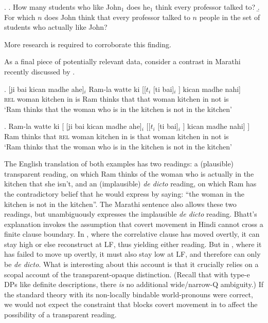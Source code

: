 \ex. \a. How many students who like John$_{1}$ does he$_{1}$ think every professor talked to? 
\b. For which $n$ does John think that every professor talked to $n$ people in the set of students who actually like John?

More research is required to corroborate this finding.

As a final piece of potentially relevant data, consider a contrast in Marathi recently discussed by \citet{bhatt:locality:99}.

\exg. [ji bai kican madhe ahe]$_{i}$ Ram-la watte ki [[$t_{i}$ [ti bai]$_{i}$ ] kican madhe nahi]\\
\textsc{rel} woman kitchen in is Ram thinks that that woman kitchen in not is\\
`Ram thinks that the woman who is in the kitchen is not in the kitchen'

\ex. Ram-la watte ki [ [ji bai kican madhe ahe]$_{i}$ [[$t_{i}$ [ti bai]$_{i}$ ] kican madhe nahi] ]\\
Ram thinks that \textsc{rel} woman kitchen in is that woman kitchen in not is\\
`Ram thinks that the woman who is in the kitchen is not in the kitchen'

The English translation of both examples has two readings: a (plausible) transparent reading, on which Ram thinks of the woman who is actually in the kitchen that she isn't, and an (implausible) \emph{de dicto} reading, on which Ram has the contradictory belief that he would express by saying: ``the woman in the kitchen is not in the kitchen''. The Marathi sentence \LLast also allows these two readings, but \Last unambiguously expresses the implausible \emph{de dicto} reading. Bhatt's explanation invokes the assumption that covert movement in Hindi cannot cross a finite clause boundary. In \LLast, where the correlative clause has moved overtly, it can stay high or else reconstruct at LF, thus yielding either reading. But in \Last, where it has failed to move up overtly, it must also stay low at LF, and therefore can only be \emph{de dicto}. What is interesting about this account is that it crucially relies on a scopal account of the transparent-opaque distinction. (Recall that with type-e DPs like definite descriptions, there \emph{is} no additional wide/narrow-Q ambiguity.) If the standard theory with its non-locally bindable world-pronouns were correct, we would not expect the constraint that blocks covert movement in \Last to affect the possibility of a transparent reading.

